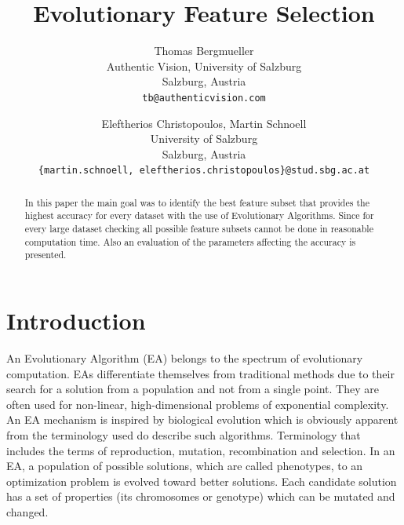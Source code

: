 \documentclass[11pt,onecolumn,a4paper]{article}
\begin{document}
\title{Evolutionary Feature Selection}

\author{Thomas Bergmueller\\
Authentic Vision, University of Salzburg\\
Salzburg, Austria\\
{\tt\small tb@authenticvision.com}
\and
Eleftherios Christopoulos, Martin Schnoell\\
University of Salzburg\\
Salzburg, Austria\\
{\tt\small \{martin.schnoell, eleftherios.christopoulos\}@stud.sbg.ac.at}
}



\maketitle
\thispagestyle{empty}
\newpage
\begin{abstract}
   In this paper the main goal was to identify the best feature subset that provides the highest accuracy for every dataset with the use of Evolutionary Algorithms. Since for every large dataset checking all possible feature subsets cannot be done in reasonable computation time. Also an evaluation of the parameters affecting the accuracy is presented.
\end{abstract}

\section{Introduction}
\label{l}
An Evolutionary Algorithm (EA) belongs to the spectrum of evolutionary computation. EAs differentiate themselves from traditional methods due to their search for a solution from a population and not from a single point. They are often used for non-linear, high-dimensional problems of exponential complexity. An EA mechanism is inspired by biological evolution which is obviously apparent from the terminology used do describe such algorithms. Terminology that includes the terms of reproduction, mutation, recombination and selection. 
In an EA, a population of possible solutions, which are called phenotypes, to an optimization problem is evolved toward better solutions. Each candidate solution has a set of properties (its chromosomes or genotype) which can be mutated and changed. \cite{dan1} 
\end{document}
